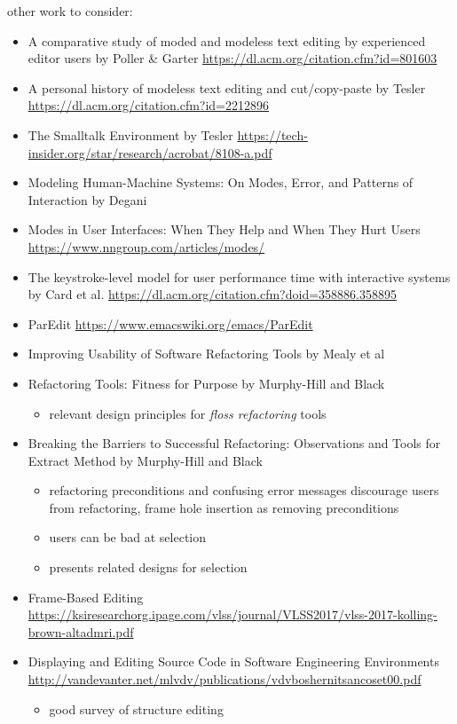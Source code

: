 \documentclass[runningheads]{llncs}
\begin{document}
other work to consider:
\begin{itemize}
\item A comparative study of moded and modeless text editing by experienced editor users by Poller \& Garter \url{https://dl.acm.org/citation.cfm?id=801603}
\item A personal history of modeless text editing and cut/copy-paste by Tesler \url{https://dl.acm.org/citation.cfm?id=2212896}
\item The Smalltalk Environment by Tesler \url{https://tech-insider.org/star/research/acrobat/8108-a.pdf}
\item Modeling Human-Machine Systems: On Modes, Error, and Patterns of Interaction by Degani %
\item Modes in User Interfaces: When They Help and When They Hurt Users \url{https://www.nngroup.com/articles/modes/}
\item The keystroke-level model for user performance time with interactive systems by Card et al. \url{https://dl.acm.org/citation.cfm?doid=358886.358895}
\item ParEdit \url{https://www.emacswiki.org/emacs/ParEdit}
\item Improving Usability of Software Refactoring Tools by Mealy et al
\item Refactoring Tools: Fitness for Purpose by Murphy-Hill and Black
	\begin{itemize}
		\item relevant design principles for \emph{floss refactoring} tools
	\end{itemize}
\item Breaking the Barriers to Successful Refactoring: Observations and Tools for Extract Method by Murphy-Hill and Black
	\begin{itemize}
		\item refactoring preconditions and confusing error messages discourage users from refactoring, frame hole insertion as removing preconditions
		\item users can be bad at selection
		\item presents related designs for selection
	\end{itemize}
\item Frame-Based Editing \url{https://ksiresearchorg.ipage.com/vlss/journal/VLSS2017/vlss-2017-kolling-brown-altadmri.pdf}
\item Displaying and Editing Source Code in Software Engineering Environments \url{http://vandevanter.net/mlvdv/publications/vdvboshernitsancoset00.pdf}
	\begin{itemize}
		\item good survey of structure editing
	\end{itemize}
\end{itemize}
\end{document}
